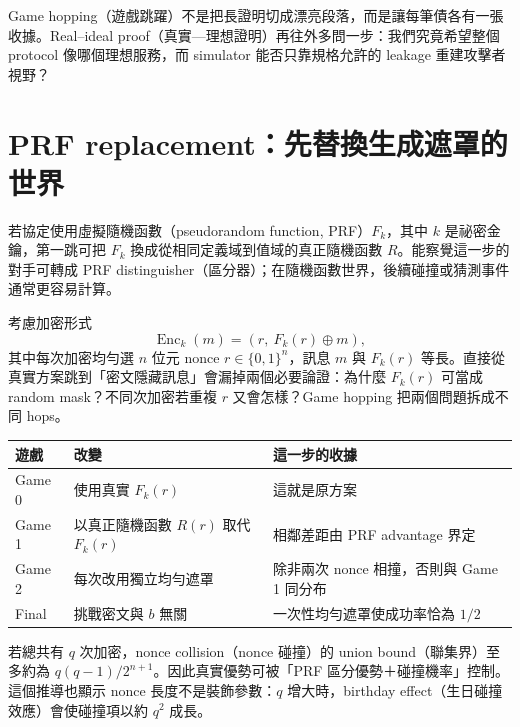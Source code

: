 \documentclass[11pt,a4paper,oneside,openany]{book}
\begin{document}
Game hopping（遊戲跳躍）不是把長證明切成漂亮段落，而是讓每筆債各有一張收據。Real--ideal proof（真實—理想證明）再往外多問一步：我們究竟希望整個 protocol 像哪個理想服務，而 simulator 能否只靠規格允許的 leakage 重建攻擊者視野？

\section{PRF replacement：先替換生成遮罩的世界}
若協定使用虛擬隨機函數（pseudorandom function, PRF）$F_k$，其中 $k$ 是祕密金鑰，第一跳可把 $F_k$ 換成從相同定義域到值域的真正隨機函數 $R$。能察覺這一步的對手可轉成 PRF distinguisher（區分器）；在隨機函數世界，後續碰撞或猜測事件通常更容易計算。

考慮加密形式
\[
 \operatorname{Enc}_k(m)=(r,\ F_k(r)\oplus m),
\]
其中每次加密均勻選 $n$ 位元 nonce $r\in\{0,1\}^n$，訊息 $m$ 與 $F_k(r)$ 等長。直接從真實方案跳到「密文隱藏訊息」會漏掉兩個必要論證：為什麼 $F_k(r)$ 可當成 random mask？不同次加密若重複 $r$ 又會怎樣？Game hopping 把兩個問題拆成不同 hops。

\begin{center}
\begin{tabularx}{.96\textwidth}{@{}lYY@{}}
\toprule
遊戲 & 改變 & 這一步的收據 \\
\midrule
Game 0 & 使用真實 $F_k(r)$ & 這就是原方案 \\
Game 1 & 以真正隨機函數 $R(r)$ 取代 $F_k(r)$ & 相鄰差距由 PRF advantage 界定 \\
Game 2 & 每次改用獨立均勻遮罩 & 除非兩次 nonce 相撞，否則與 Game 1 同分布 \\
Final & 挑戰密文與 $b$ 無關 & 一次性均勻遮罩使成功率恰為 $1/2$ \\
\bottomrule
\end{tabularx}
\end{center}
若總共有 $q$ 次加密，nonce collision（nonce 碰撞）的 union bound（聯集界）至多約為 $q(q-1)/2^{n+1}$。因此真實優勢可被「PRF 區分優勢＋碰撞機率」控制。這個推導也顯示 nonce 長度不是裝飾參數：$q$ 增大時，birthday effect（生日碰撞效應）會使碰撞項以約 $q^2$ 成長。
\end{document}
